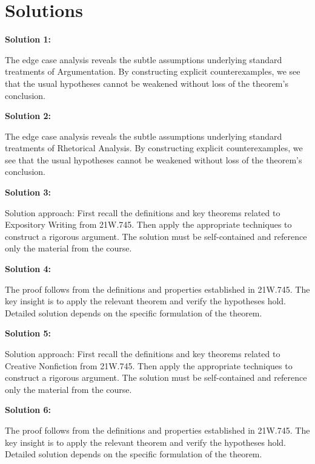 \documentclass[12pt,a4paper]{exam}
\begin{document}
\newpage
\section*{Solutions}

\textbf{Solution 1:}

The edge case analysis reveals the subtle assumptions underlying standard treatments of Argumentation. By constructing explicit counterexamples, we see that the usual hypotheses cannot be weakened without loss of the theorem's conclusion.

\vspace{0.5cm}

\textbf{Solution 2:}

The edge case analysis reveals the subtle assumptions underlying standard treatments of Rhetorical Analysis. By constructing explicit counterexamples, we see that the usual hypotheses cannot be weakened without loss of the theorem's conclusion.

\vspace{0.5cm}

\textbf{Solution 3:}

Solution approach: First recall the definitions and key theorems related to Expository Writing from 21W.745. Then apply the appropriate techniques to construct a rigorous argument. The solution must be self-contained and reference only the material from the course.

\vspace{0.5cm}

\textbf{Solution 4:}

The proof follows from the definitions and properties established in 21W.745. The key insight is to apply the relevant theorem and verify the hypotheses hold. Detailed solution depends on the specific formulation of the theorem.

\vspace{0.5cm}

\textbf{Solution 5:}

Solution approach: First recall the definitions and key theorems related to Creative Nonfiction from 21W.745. Then apply the appropriate techniques to construct a rigorous argument. The solution must be self-contained and reference only the material from the course.

\vspace{0.5cm}

\textbf{Solution 6:}

The proof follows from the definitions and properties established in 21W.745. The key insight is to apply the relevant theorem and verify the hypotheses hold. Detailed solution depends on the specific formulation of the theorem.
\end{document}
